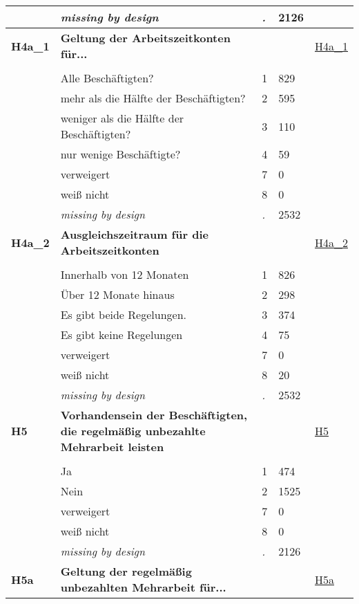 \begin{longtable}{| L{2.65cm} | L{8cm} | C{1.5cm} | R{1.25cm} | C{2.25cm}  |}
   & \textit{missing by design} & \textit{.} & 2126 &  \\ 
   \midrule
\textbf{H4a\_1}\label{var:H4a:1} & \textbf{Geltung der Arbeitszeitkonten für...} &  &  & \hyperref[H4a:1]{H4a\_1} \\ 
   &  &  &  &  \\ 
   & Alle Beschäftigten? & 1 & 829 &  \\ 
   & mehr als die Hälfte der Beschäftigten? & 2 & 595 &  \\ 
   & weniger als die Hälfte der Beschäftigten? & 3 & 110 &  \\ 
   & nur wenige Beschäftigte? & 4 & 59 &  \\ 
   & verweigert & 7 & 0 &  \\ 
   & weiß nicht & 8 & 0 &  \\ 
   & \textit{missing by design} & \textit{.} & 2532 &  \\ 
   \midrule
\textbf{H4a\_2}\label{var:H4a:2} & \textbf{Ausgleichszeitraum für die Arbeitszeitkonten} &  &  & \hyperref[H4a:2]{H4a\_2} \\ 
   &  &  &  &  \\ 
   & Innerhalb von 12 Monaten & 1 & 826 &  \\ 
   & Über 12 Monate hinaus & 2 & 298 &  \\ 
   & Es gibt beide Regelungen. & 3 & 374 &  \\ 
   & Es gibt keine Regelungen & 4 & 75 &  \\ 
   & verweigert & 7 & 0 &  \\ 
   & weiß nicht & 8 & 20 &  \\ 
   & \textit{missing by design} & \textit{.} & 2532 &  \\ 
   \midrule
\textbf{H5}\label{var:H5} & \textbf{Vorhandensein der Beschäftigten, die regelmäßig unbezahlte Mehrarbeit leisten} &  &  & \hyperref[H5]{H5} \\ 
   &  &  &  &  \\ 
   & Ja & 1 & 474 &  \\ 
   & Nein & 2 & 1525 &  \\ 
   & verweigert & 7 & 0 &  \\ 
   & weiß nicht & 8 & 0 &  \\ 
   & \textit{missing by design} & \textit{.} & 2126 &  \\ 
   \midrule
\textbf{H5a}\label{var:H5a} & \textbf{Geltung der regelmäßig unbezahlten Mehrarbeit für...} &  &  & \hyperref[H5a]{H5a} \\ 

\end{longtable}
